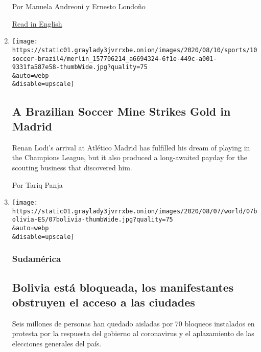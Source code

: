 \begin{enumerate}
  Por Manuela Andreoni y Ernesto Londoño

  \href{https://www.nytimes3xbfgragh.onion/2020/08/15/world/americas/brazil-coronavirus-vaccine.html}{Read
  in English}
\item
  \href{/2020/08/09/sports/soccer/atletico-madrid-champions-league-renan-lodi.html}{}

  \texttt{[image: https://static01.graylady3jvrrxbe.onion/images/2020/08/10/sports/10soccer-brazil4/merlin\_157706214\_a6694324-6f1e-449c-a001-9331fa587e58-thumbWide.jpg?quality=75\\\&auto=webp\\\&disable=upscale]}

  \hypertarget{a-brazilian-soccer-mine-strikes-gold-in-madrid}{%
  \subsection{A Brazilian Soccer Mine Strikes Gold in
  Madrid}\label{a-brazilian-soccer-mine-strikes-gold-in-madrid}}

  Renan Lodi's arrival at Atlético Madrid has fulfilled his dream of
  playing in the Champions League, but it also produced a long-awaited
  payday for the scouting business that discovered him.

  Por Tariq Panja
\item
  \href{/es/2020/08/07/espanol/america-latina/bloqueos-bolivia.html}{}

  \texttt{[image: https://static01.graylady3jvrrxbe.onion/images/2020/08/07/world/07bolivia-ES/07bolivia-thumbWide.jpg?quality=75\\\&auto=webp\\\&disable=upscale]}

  \hypertarget{sudamuxe9rica-1}{%
  \subsubsection{Sudamérica}\label{sudamuxe9rica-1}}

  \hypertarget{bolivia-estuxe1-bloqueada-los-manifestantes-obstruyen-el-acceso-a-las-ciudades}{%
  \subsection{Bolivia está bloqueada, los manifestantes obstruyen el
  acceso a las
  ciudades}\label{bolivia-estuxe1-bloqueada-los-manifestantes-obstruyen-el-acceso-a-las-ciudades}}

  Seis millones de personas han quedado aisladas por 70 bloqueos
  instalados en protesta por la respuesta del gobierno al coronavirus y
  el aplazamiento de las elecciones generales del país.


\end{enumerate}
